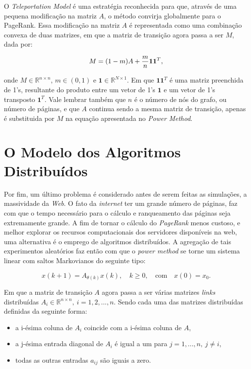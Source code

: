 O \textit{Teleportation Model} é uma estratégia reconhecida para que, através de uma pequena modificação na matriz $A$, o método convirja globalmente para o PageRank. Essa modificação na matriz $A$ é representada como uma combinação convexa de duas matrizes, em que a matriz de transição agora passa a ser $M$, dada por:

\begin{equation}
M = (1-m)A + \frac{m}{n}{\bf11}^T,
\end{equation}

\noindent onde $M \in \mathbb{R}^{n \times n}$, $m \in (0,1)$ e $\textbf{1} \in \mathbb{R}^{N \times 1}$. Em que $\textbf{11}^T$ é uma matriz preenchida de 1's, resultante do produto entre um vetor de 1's $\textbf{1}$ e um vetor de 1's transposto $\textbf{1}^T$. Vale lembrar também que $n$ é o número de nós do grafo, ou número de páginas, e que $A$ continua sendo a mesma matriz de transição, apenas é substituida por $M$ na equação apresentada no \textit{Power Method}.


\section{O Modelo dos Algoritmos Distribu\'idos}%

Por fim, um último problema é considerado antes de serem feitas as simulações, a massividade da \textit{Web}. O fato da \textit{internet} ter um grande número de páginas, faz com que o tempo necessário para o cálculo e ranqueamento das páginas seja extremamente grande. A fim de tornar o cálculo do \textit{PageRank} menos custoso, e melhor explorar os recursos computacionais dos servidores disponíveis na web, uma alternativa é o emprego de algoritmos distribuídos. A agregação de tais experimentos aleatórios faz então com que o \textit{power method} se torne um sistema linear com saltos Markovianos do seguinte tipo:

\begin{equation}
	x(k+1) = A_{\theta(k)}x(k), \quad k\geq0, \quad \text{com} \quad x(0) = x_0. 
\end{equation}

Em que a matriz de transição $A$ agora passa a ser várias matrizes \textit{links} distribu\'idas $A_i \in \mathbb{R}^{n \times n}, \: i = 1,2, ..., n$. Sendo cada uma das matrizes distribuídas definidas da seguinte forma: 

\begin{itemize}
\item a i-ésima coluna de $A_i$ coincide com a i-ésima coluna de $A$,
\item a j-ésima entrada diagonal de $A_i$ é igual a um para $j = 1, ..., n, \: j \neq i$,
\item todas as outras entradas $a_{ij}$ são iguais a zero.
\end{itemize}

